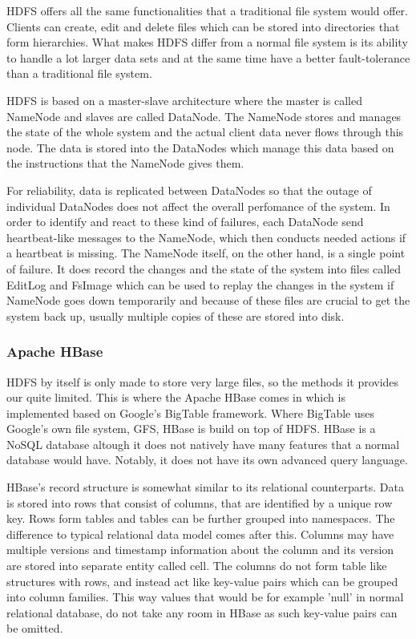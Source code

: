 HDFS offers all the same functionalities that a traditional file system would offer.
Clients can create, edit and delete files which can be stored into directories that form hierarchies.
What makes HDFS differ from a normal file system is its ability to handle a lot larger data sets and at the same time have a better fault-tolerance than a traditional file system.\cite{hdfs}

HDFS is based on a master-slave architecture where the master is called NameNode and slaves are called DataNode.
The NameNode stores and manages the state of the whole system and the actual client data never flows through this node.
The data is stored into the DataNodes which manage this data based on the instructions that the NameNode gives them.\cite{hdfs}

For reliability, data is replicated between DataNodes so that the outage of individual DataNodes does not affect the overall perfomance of the system.
In order to identify and react to these kind of failures, each DataNode send heartbeat-like messages to the NameNode, which then conducts needed actions if a heartbeat is missing.
The NameNode itself, on the other hand, is a single point of failure.
It does record the changes and the state of the system into files called EditLog and FsImage which can be used to replay the changes in the system if NameNode goes down temporarily and because of these files are crucial to get the system back up, usually multiple copies of these are stored into disk. \cite{hdfs}

\subsubsection{Apache HBase}

HDFS by itself is only made to store very large files, so the methods it provides our quite limited.
This is where the Apache HBase comes in which is implemented based on Google's BigTable framework.
Where BigTable uses Google's own file system, GFS, HBase is build on top of HDFS. 
HBase is a NoSQL database altough it does not natively have many features that a normal database would have.
Notably, it does not have its own advanced query language.\cite{george}

HBase's record structure is somewhat similar to its relational counterparts.
Data is stored into rows that consist of columns, that are identified by a unique row key.
Rows form tables and tables can be further grouped into namespaces.
The difference to typical relational data model comes after this.
Columns may have multiple versions and timestamp information about the column and its version are stored into separate entity called cell.
The columns do not form table like structures with rows, and instead act like key-value pairs which can be grouped into column families.
This way values that would be for example 'null' in normal relational database, do not take any room in HBase as such key-value pairs can be omitted. \cite{george}

